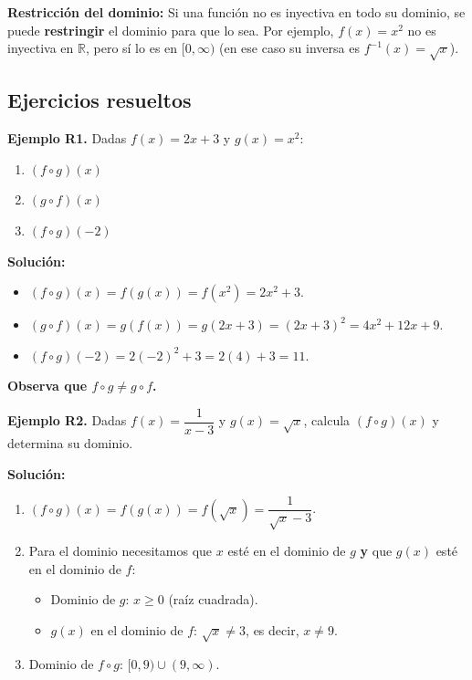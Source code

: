 \documentclass[12pt, a4paper]{article}
\begin{document}
\begin{cuadroadvertencia}
  \textbf{Restricción del dominio:} Si una función no es inyectiva en todo su dominio, se puede \textbf{restringir} el dominio para que lo sea. Por ejemplo, $f(x) = x^2$ no es inyectiva en $\mathbb{R}$, pero sí lo es en $[0, \infty)$ (en ese caso su inversa es $f^{-1}(x) = \sqrt{x}$).
\end{cuadroadvertencia}

\subsection{Ejercicios resueltos}

\textbf{Ejemplo R1.} Dadas $f(x) = 2x + 3$ y $g(x) = x^2$:
\begin{enumerate}[label=\alph*)]
  \item $(f \circ g)(x)$
  \item $(g \circ f)(x)$
  \item $(f \circ g)(-2)$
\end{enumerate}

\begin{cuadrosolucion}
  \textbf{Solución:}
  \begin{itemize}
    \item $(f \circ g)(x) = f(g(x)) = f(x^2) = 2x^2 + 3$.
    \item $(g \circ f)(x) = g(f(x)) = g(2x + 3) = (2x + 3)^2 = 4x^2 + 12x + 9$.
    \item $(f \circ g)(-2) = 2(-2)^2 + 3 = 2(4) + 3 = 11$.
  \end{itemize}
  \textbf{Observa que $f \circ g \neq g \circ f$.}
\end{cuadrosolucion}

\newpage

\textbf{Ejemplo R2.} Dadas $f(x) = \dfrac{1}{x - 3}$ y $g(x) = \sqrt{x}$, calcula $(f \circ g)(x)$ y determina su dominio.

\begin{cuadrosolucion}
  \textbf{Solución:}
  \begin{enumerate}
    \item $(f \circ g)(x) = f(g(x)) = f(\sqrt{x}) = \dfrac{1}{\sqrt{x} - 3}$.
    \item Para el dominio necesitamos que $x$ esté en el dominio de $g$ \textbf{y} que $g(x)$ esté en el dominio de $f$:
          \begin{itemize}
            \item Dominio de $g$: $x \geq 0$ (raíz cuadrada).
            \item $g(x)$ en el dominio de $f$: $\sqrt{x} \neq 3$, es decir, $x \neq 9$.
          \end{itemize}
    \item Dominio de $f \circ g$: $[0, 9) \cup (9, \infty)$.
  \end{enumerate}
\end{cuadrosolucion}
\end{document}
